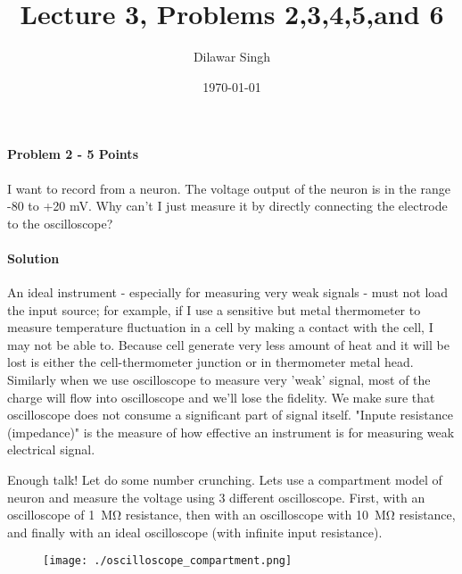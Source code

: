 \documentclass[a4paper,10pt]{article}
\title{Lecture 3, Problems 2,3,4,5,and 6}
\author{Dilawar Singh}
\date{\today}
\begin{document}
\maketitle

\paragraph{Problem 2 - 5 Points}
I want to record from a neuron. The voltage output of the neuron is in the range
-80 to +20 mV. Why can’t I just measure it by directly connecting the electrode
to the oscilloscope?

\paragraph{Solution} An ideal instrument - especially for measuring very weak 
signals - must not load the input source; for example, if I
use a sensitive but metal thermometer to measure temperature fluctuation in a cell 
by making a contact with the cell, I may not be able to. Because cell generate
very less amount of heat and it will be lost is either the cell-thermometer
junction or in thermometer metal head.
Similarly when we use oscilloscope to measure very 'weak' signal, most of the
charge will flow into oscilloscope and we'll lose the fidelity. We make sure
that oscilloscope does not consume a significant part of signal itself. "Inpute
resistance (impedance)" is the measure of how effective an instrument is for
measuring weak electrical signal.

Enough talk! Let do some number crunching. Lets use a compartment model of
neuron and measure the voltage using 3 different oscilloscope. First, with an
oscilloscope of \SI{1}{\mega \ohm} resistance, then with an oscilloscope with
\SI{10}{\mega \ohm} resistance, and finally with an ideal oscilloscope (with infinite input
resistance). 

\begin{figure}[h!]
    \texttt{[image: ./oscilloscope\_compartment.png]}
\end{figure}
\end{document}
